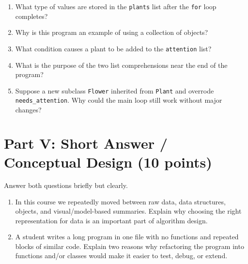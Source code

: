 \documentclass[12pt]{article}
\begin{document}
\begin{enumerate}[label=\arabic*.]
\item What type of values are stored in the \texttt{plants} list after the \texttt{for} loop completes?
\vspace{0.6in}

\item Why is this program an example of using a collection of objects?
\vspace{0.6in}

\item What condition causes a plant to be added to the \texttt{attention} list?
\vspace{0.6in}

\item What is the purpose of the two list comprehensions near the end of the program?
\vspace{0.6in}

\item Suppose a new subclass \texttt{Flower} inherited from \texttt{Plant} and overrode \texttt{needs\_attention}. Why could the main loop still work without major changes?
\vspace{1.0in}
\end{enumerate}

\newpage

\section*{Part V: Short Answer / Conceptual Design (10 points)}

Answer both questions briefly but clearly.

\begin{enumerate}[label=\arabic*.]
\item In this course we repeatedly moved between raw data, data structures, objects, and visual/model-based summaries. Explain why choosing the right representation for data is an important part of algorithm design.

\vspace{2.2in}

\item A student writes a long program in one file with no functions and repeated blocks of similar code. Explain two reasons why refactoring the program into functions and/or classes would make it easier to test, debug, or extend.

\vspace{2.2in}
\end{enumerate}
\end{document}
